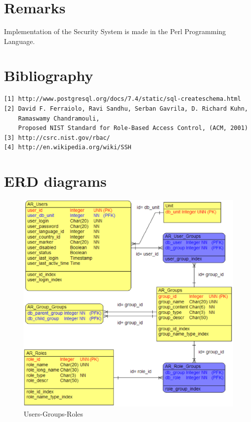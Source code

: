 \section{Remarks}
Implementation of the Security System is made in the Perl Programming Language. 

\section{Bibliography}
\begin{verbatim}
[1] http://www.postgresql.org/docs/7.4/static/sql-createschema.html 
[2] David F. Ferraiolo, Ravi Sandhu, Serban Gavrila, D. Richard Kuhn,
    Ramaswamy Chandramouli, 
    Proposed NIST Standard for Role-Based Access Control, (ACM, 2001) 
[3] http://csrc.nist.gov/rbac/
[4] http://en.wikipedia.org/wiki/SSH
\end{verbatim} 

\section{ERD diagrams\label{erddiagrams}}

\begin{figure}
\begin{center}%
   \includegraphics[scale=1]{./access-control/ar_user_group_role.eps}
   \caption{Users-Groups-Roles}
   \label{fig:users-groups-roles}
\end{center}
\end{figure}

